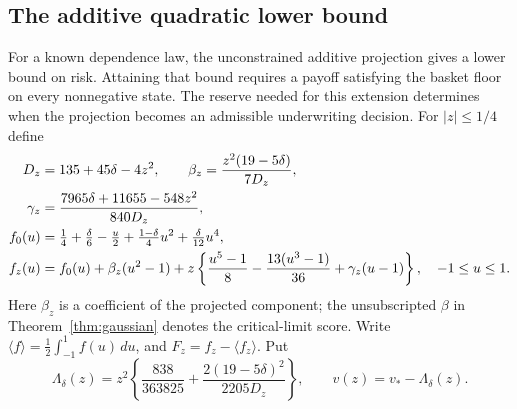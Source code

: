 \documentclass[11pt,a4paper]{amsart}
\theoremstyle{plain}
\theoremstyle{definition}
\theoremstyle{remark}
\newcommand{\br}[1]{\langle #1\rangle}
\begin{document}
\subsection{The additive quadratic lower bound}
For a known dependence law, the unconstrained additive projection gives a lower bound on risk. Attaining that bound requires a payoff satisfying the basket floor on every nonnegative state. The reserve needed for this extension determines when the projection becomes an admissible underwriting decision. For $|z|\le1/4$ define
\begin{align}\label{eq:projectioncoeff}
 D_z&=135+45\delta-4z^2,\qquad
 \beta_z=\frac{z^2(19-5\delta)}{7D_z},\notag\\
 \gamma_z&=\frac{7965\delta+11655-548z^2}{840D_z},\notag\\
 f_0(u)&=\tfrac14+\tfrac\delta6-\tfrac u2
          +\tfrac{1-\delta}{4}u^2+\tfrac\delta{12}u^4,\notag\\
 f_z(u)&=f_0(u)+\beta_z(u^2-1)
 +z\left\{\frac{u^5-1}{8}-\frac{13(u^3-1)}{36}+\gamma_z(u-1)\right\},
 \quad -1\le u\le1.
\end{align}
Here $\beta_z$ is a coefficient of the projected component; the unsubscripted $\beta$ in Theorem~\ref{thm:gaussian} denotes the critical-limit score. Write $\br{f}=\frac12\int_{-1}^1f(u)\,du$, and $F_z=f_z-\br{f_z}$. Put
\begin{equation}\label{eq:projectiongain}
 \Lambda_\delta(z)=z^2\left\{\frac{838}{363825}
 +\frac{2(19-5\delta)^2}{2205D_z}\right\},\qquad
 v(z)=v_*-\Lambda_\delta(z).
\end{equation}
\end{document}
